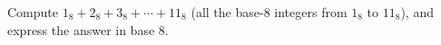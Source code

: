 Compute $1_8+2_8+3_8+\cdots+11_8$ (all the base-$8$ integers from $1_8$ to $11_8$), and express the answer in base $8$.
